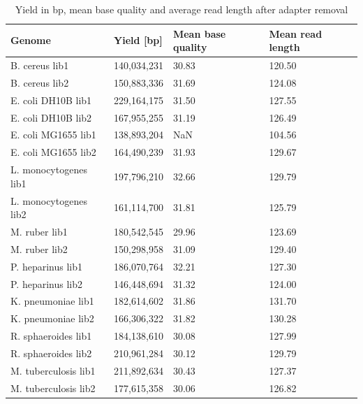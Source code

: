 \begin{table}[]
\begin{center}
{
{\begin{tabular}{llll}\hline
Genome & Yield [bp] & Mean base quality & Mean read length \\\hline
B. cereus lib1 & 140,034,231 & 30.83 & 120.50  \\
B. cereus lib2 & 150,883,336 & 31.69 & 124.08  \\
E. coli DH10B lib1 & 229,164,175 & 31.50 & 127.55 \\
E. coli DH10B lib2 & 167,955,255 & 31.19 & 126.49 \\
E. coli MG1655 lib1 & 138,893,204 & NaN & 104.56 \\
E. coli MG1655 lib2 & 164,490,239 & 31.93 & 129.67 \\
L. monocytogenes lib1 & 197,796,210 & 32.66 & 129.79 \\
L. monocytogenes lib2 & 161,114,700 & 31.81 & 125.79 \\
M. ruber lib1 & 180,542,545 & 29.96 & 123.69 \\
M. ruber lib2 & 150,298,958 & 31.09 & 129.40 \\
P. heparinus lib1 & 186,070,764 & 32.21 & 127.30 \\
P. heparinus lib2 & 146,448,694 & 31.32 & 124.00 \\
K. pneumoniae lib1 & 182,614,602 & 31.86 & 131.70 \\
K. pneumoniae lib2 & 166,306,322 & 31.82 & 130.28 \\
R. sphaeroides lib1 & 184,138,610 & 30.08 & 127.99 \\
R. sphaeroides lib2 & 210,961,284 & 30.12 & 129.79 \\
M. tuberculosis lib1 & 211,892,634 & 30.43 & 127.37 \\
M. tuberculosis lib2 & 177,615,358 & 30.06 & 126.82 \\\hline
\end{tabular}}{}
}
\end{center}
\caption{Yield in bp, mean base quality and average read length after adapter removal \label{tab:yield}}
\end{table}  


